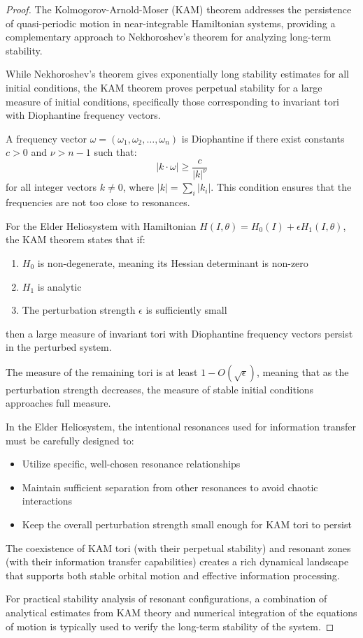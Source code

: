 \begin{proof}
The Kolmogorov-Arnold-Moser (KAM) theorem addresses the persistence of quasi-periodic motion in near-integrable Hamiltonian systems, providing a complementary approach to Nekhoroshev's theorem for analyzing long-term stability.

While Nekhoroshev's theorem gives exponentially long stability estimates for all initial conditions, the KAM theorem proves perpetual stability for a large measure of initial conditions, specifically those corresponding to invariant tori with Diophantine frequency vectors.

A frequency vector $\omega = (\omega_1, \omega_2, \ldots, \omega_n)$ is Diophantine if there exist constants $c > 0$ and $\nu > n-1$ such that:
\begin{equation}
|k \cdot \omega| \geq \frac{c}{|k|^\nu}
\end{equation}
for all integer vectors $k \neq 0$, where $|k| = \sum_i |k_i|$. This condition ensures that the frequencies are not too close to resonances.

For the Elder Heliosystem with Hamiltonian $H(I, \theta) = H_0(I) + \epsilon H_1(I, \theta)$, the KAM theorem states that if:
\begin{enumerate}
    \item $H_0$ is non-degenerate, meaning its Hessian determinant is non-zero
    \item $H_1$ is analytic
    \item The perturbation strength $\epsilon$ is sufficiently small
\end{enumerate}
then a large measure of invariant tori with Diophantine frequency vectors persist in the perturbed system.

The measure of the remaining tori is at least $1 - O(\sqrt{\epsilon})$, meaning that as the perturbation strength decreases, the measure of stable initial conditions approaches full measure.

In the Elder Heliosystem, the intentional resonances used for information transfer must be carefully designed to:
\begin{itemize}
    \item Utilize specific, well-chosen resonance relationships
    \item Maintain sufficient separation from other resonances to avoid chaotic interactions
    \item Keep the overall perturbation strength small enough for KAM tori to persist
\end{itemize}

The coexistence of KAM tori (with their perpetual stability) and resonant zones (with their information transfer capabilities) creates a rich dynamical landscape that supports both stable orbital motion and effective information processing.

For practical stability analysis of resonant configurations, a combination of analytical estimates from KAM theory and numerical integration of the equations of motion is typically used to verify the long-term stability of the system.
\end{proof}

